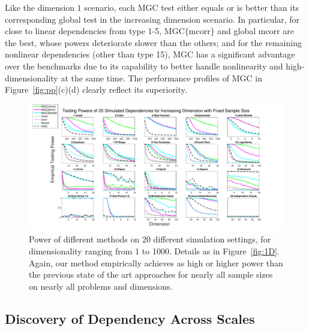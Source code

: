 \documentclass[11pt]{article}
\begin{document}
Like the dimension $1$ scenario, each MGC test either equals or is better than its corresponding global test in the increasing dimension scenario. In particular, for close to linear dependencies from type 1-5, MGC$\{$mcorr$\}$ and global mcorr are the best, whose powers deteriorate slower than the others; and for the remaining nonlinear dependencies (other than type 15), MGC has a significant advantage over the benchmarks due to its capability to better handle nonlinearity and high-dimensionality at the same time. The performance profiles of MGC in Figure~\ref{fig:pp}(c)(d) clearly reflect its superiority.



\begin{figure}[htbp]
\includegraphics[width=1.0\textwidth]{../Figures/Fig5}
\caption{Power of different methods on 20 different simulation settings, for dimensionality ranging from 1 to 1000.  Details as in Figure~\ref{fig:1D}.
Again, our method empirically achieves as high or higher power than the previous state of the art approaches for nearly all sample sizes on nearly all problems and dimensions.
}
\label{fig:nD}
\end{figure}

\subsection{Discovery of Dependency Across Scales}
\label{main3}
\end{document}
